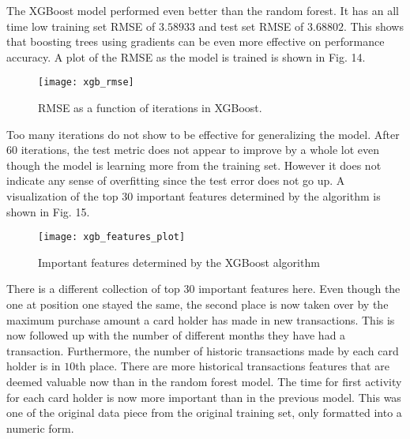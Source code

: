 \documentclass[journal, a4paper]{IEEEtran}
\begin{document}
The XGBoost model performed even better than the random forest. It has an all time low training set RMSE of $3.58933$ and test set RMSE of $3.68802$. This shows that boosting trees using gradients can be even more effective on performance accuracy. A plot of the RMSE as the model is trained is shown in Fig. 14. \begin{figure}[h!] \texttt{[image: xgb\_rmse]} \caption{RMSE as a function of iterations in XGBoost.} \end{figure} Too many iterations do not show to be effective for generalizing the model. After $60$ iterations, the test metric does not appear to improve by a whole lot even though the model is learning more from the training set. However it does not indicate any sense of overfitting since the test error does not go up. A visualization of the top $30$ important features determined by the algorithm is shown in Fig. 15. \begin{figure}[h!] \texttt{[image: xgb\_features\_plot]} \caption{Important features determined by the XGBoost algorithm} \end{figure} There is a different collection of top $30$ important features here. Even though the one at position one stayed the same, the second place is now taken over by the maximum purchase amount a card holder has made in new transactions. This is now followed up with the number of different months they have had a transaction. Furthermore, the number of historic transactions made by each card holder is in $10$th place. There are more historical transactions features that are deemed valuable now than in the random forest model. The time for first activity for each card holder is now more important than in the previous model. This was one of the original data piece from the original training set, only formatted into a numeric form. 
\end{document}
